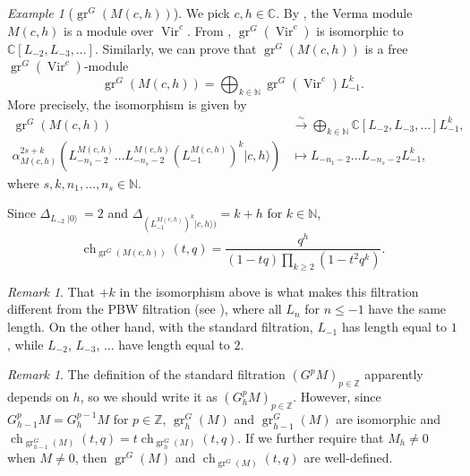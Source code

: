 \documentclass[a4paper, 12pt, reqno]{amsart}
\theoremstyle{remark}
\newtheorem{remark}[theorem]{Remark}
\newtheorem{example}[theorem]{Example}
\DeclareMathOperator{\Vir}{Vir}
\DeclareMathOperator{\gr}{gr}
\DeclareMathOperator{\ch}{ch}
\DeclareMathOperator{\vac}{|0\rangle}
\begin{document}
\begin{example}[$\gr^G(M(c, h))$]
  \label{exa:15}
  We pick $c, h \in \mathbb{C}$.
  By , the Verma module $M(c, h)$ is a module over $\Vir^c$.
  From , $\gr^G(\Vir^c)$ is isomorphic to $\mathbb{C}[L_{-2}, L_{-3}, \dots]$.
  Similarly, we can prove that $\gr^G(M(c, h))$ is a free $\gr^G(\Vir^c)$-module
  \begin{equation*}
    \gr^G(M(c, h)) = \bigoplus_{k \in \mathbb{N}}\gr^G(\Vir^c)L_{-1}^k.
  \end{equation*}
  More precisely, the isomorphism is given by
  \begin{align*}
    \gr^G(M(c, h)) &\xrightarrow{\sim} \bigoplus_{k \in \mathbb{N}}\mathbb{C}[L_{-2}, L_{-3}, \dots]L_{-1}^k, \\
    \alpha_{M(c, h)}^{2s + k}(L_{-n_1 - 2}^{M(c, h)}\dots L_{-n_s - 2}^{M(c, h)}(L_{-1}^{M(c, h)})^k|c, h\rangle) &\mapsto L_{-n_1 - 2}\dots L_{-n_s - 2}L_{-1}^k,
  \end{align*}
  where $s, k, n_1, \dots, n_s \in \mathbb{N}$.

  Since $\Delta_{L_{-2}\vac} = 2$ and $\Delta_{(L_{-1}^{M(c, h)})^k|c, h\rangle)} = k + h$ for $k \in \mathbb{N}$,
  \begin{equation*}
    \ch_{\gr^G(M(c, h))}(t, q) = \frac{q^h}{(1 - tq)\prod_{k \ge 2}(1 - t^2q^k)}.
  \end{equation*}
\end{example}

\begin{remark}
  \label{rmk:42}
  That $+k$ in the isomorphism above is what makes this filtration different from the PBW filtration (see ), where all $L_n$ for $n \le -1$ have the same length.
  On the other hand, with the standard filtration, $L_{-1}$ has length equal to $1$, while $L_{-2}$, $L_{-3}$, $\dots$ have length equal to $2$.
\end{remark}

\begin{remark}
  \label{rmk:43}
  The definition of the standard filtration $(G^pM)_{p \in \mathbb{Z}}$ apparently depends on $h$, so we should write it as $(G^p_hM)_{p \in \mathbb{Z}}$.
  However, since $G^p_{h - 1}M = G^{p - 1}_hM$ for $p \in \mathbb{Z}$, $\gr^G_h(M)$ and $\gr^G_{h - 1}(M)$ are isomorphic and $\ch_{\gr^G_{h - 1}(M)}(t, q) = t\ch_{\gr^G_h(M)}(t, q)$.
  If we further require that $M_h \neq 0$ when $M \neq 0$, then $\gr^G(M)$ and $\ch_{\gr^G(M)}(t, q)$ are well-defined.
\end{remark}
\end{document}
